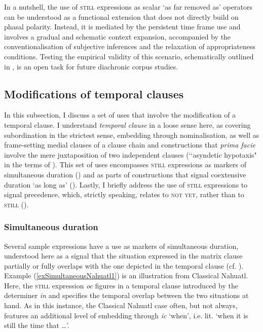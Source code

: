 In a nutshell, the use of \textsc{still} expressions as scalar \lq as far removed as\rq{ }operators can be understood as a functional extension that does not directly build on phasal polarity. Instead, it is mediated by the persistent time frame use and involves a gradual and schematic context expansion, accompanied by the conventionalisation of subjective inferences and the relaxation of appropriateness conditions. Testing the empirical validity of this scenario, schematically outlined in , is an open task for future diachronic corpus studies.

\subsection{Modifications of temporal clauses}
\label{sectionTemporalSubordination}
In this subsection, I discuss a set of uses that involve the modification of a temporal clause. I understand \textit{temporal clause} in a loose sense here, as covering subordination in the strictest sense, embedding through nominalisation, as well as frame-setting medial clauses of a clause chain and constructions that \textit{prima facie} involve the mere juxtaposition of two independent clauses (\lq\lq asyndetic hypotaxis" in the terms of \citeauthor{Gueldemann1998} \citeyear{Gueldemann1998}). This set of uses encompasses \textsc{still} expressions as markers of simultaneous duration () and as parts of constructions that signal coextensive duration \lq as long as\rq{ } (). Lastly, I briefly address the use of \textsc{still} expressions to signal precedence, which, strictly speaking, relates to \textsc{not yet}, rather than to \textsc{still} ().

\subsubsection{Simultaneous duration}\label{sectionSimultaneity}
Several sample expressions have a use as markers of simultaneous duration, understood here as a signal that the situation expressed in the matrix clause partially or fully overlaps with the one depicted in the temporal clause (cf. \cite[84]{Kortmann1997}). Example (\ref{exSimultaneousNahuatl1}) is an illustration from Classical Nahuatl. Here, the \textsc{still} expression \textit{oc} figures in a temporal clause introduced by the determiner \textit{in} and specifies the temporal overlap between the two situations at hand. As in this instance, the Classical Nahuatl case often, but not always, features an additional level of embedding through \textit{ic} \lq when\rq{}, i.e. lit. \lq when it is still the time that …\rq{}.


